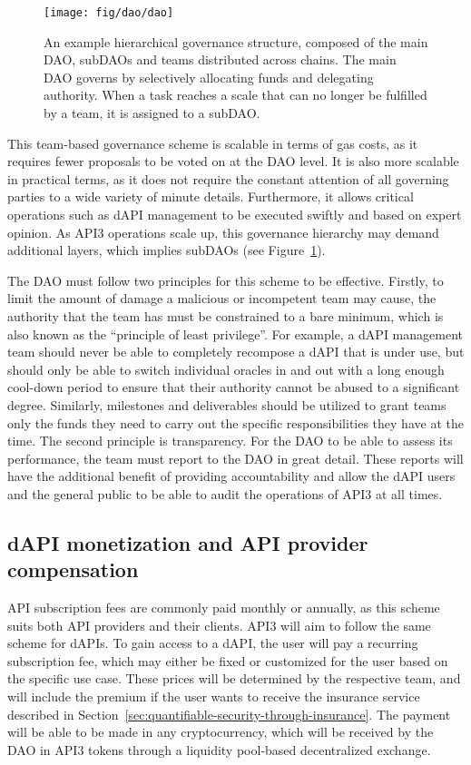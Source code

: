 \documentclass[11pt]{article}
\begin{document}
\begin{figure}[t]
    \centering
	\texttt{[image: fig/dao/dao]}
	\caption{An example hierarchical governance structure, composed of the main DAO, subDAOs and teams distributed across chains.
	The main DAO governs by selectively allocating funds and delegating authority.
	When a task reaches a scale that can no longer be fulfilled by a team, it is assigned to a subDAO.}
	\label{fig:dao}
\end{figure}

This team-based governance scheme is scalable in terms of gas costs, as it requires fewer proposals to be voted on at the DAO level.
It is also more scalable in practical terms, as it does not require the constant attention of all governing parties to a wide variety of minute details.
Furthermore, it allows critical operations such as dAPI management to be executed swiftly and based on expert opinion.
As API3 operations scale up, this governance hierarchy may demand additional layers, which implies subDAOs (see Figure~\ref{fig:dao}).

The DAO must follow two principles for this scheme to be effective.
Firstly, to limit the amount of damage a malicious or incompetent team may cause, the authority that the team has must be constrained to a bare minimum, which is also known as the ``principle of least privilege''.
For example, a dAPI management team should never be able to completely recompose a dAPI that is under use, but should only be able to switch individual oracles in and out with a long enough cool-down period to ensure that their authority cannot be abused to a significant degree.
Similarly, milestones and deliverables should be utilized to grant teams only the funds they need to carry out the specific responsibilities they have at the time.
The second principle is transparency.
For the DAO to be able to assess its performance, the team must report to the DAO in great detail.
These reports will have the additional benefit of providing accountability and allow the dAPI users and the general public to be able to audit the operations of API3 at all times.

\subsection{dAPI monetization and API provider compensation}
\label{sec:dapi-monetization-and-api-provider-compensation}

API subscription fees are commonly paid monthly or annually, as this scheme suits both API providers and their clients.
API3 will aim to follow the same scheme for dAPIs.
To gain access to a dAPI, the user will pay a recurring subscription fee, which may either be fixed or customized for the user based on the specific use case.
These prices will be determined by the respective team, and will include the premium if the user wants to receive the insurance service described in Section~\ref{sec:quantifiable-security-through-insurance}.
The payment will be able to be made in any cryptocurrency, which will be received by the DAO in API3 tokens through a liquidity pool-based decentralized exchange.
\end{document}
